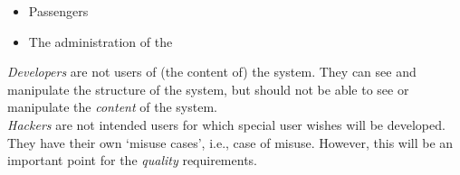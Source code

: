 \begin{itemize}
\item Passengers
\item The administration of the \projectname
\end{itemize}
\textit{Developers} are not users of (the content of) the system. They can see and manipulate 
the structure of the system, but should not be able to see or manipulate the \textit{content} of the system.\\
\textit{Hackers} are not intended users for which special user wishes will be developed. They have 
their own ‘misuse cases’, i.e., case of misuse. However, this will be an important point for the \textit{quality} requirements.